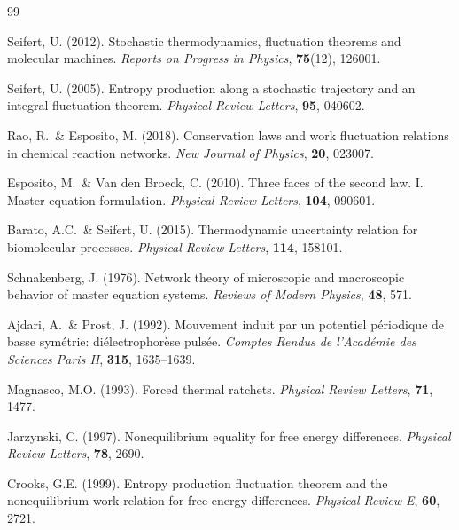 \documentclass[11pt,a4paper]{article}
\begin{document}
\begin{thebibliography}{99}

  Seifert, U. (2012).
  Stochastic thermodynamics, fluctuation theorems and molecular machines.
  \textit{Reports on Progress in Physics}, \textbf{75}(12), 126001.

  Seifert, U. (2005).
  Entropy production along a stochastic trajectory and an integral
  fluctuation theorem.
  \textit{Physical Review Letters}, \textbf{95}, 040602.

  Rao, R.\ \& Esposito, M. (2018).
  Conservation laws and work fluctuation relations in chemical reaction networks.
  \textit{New Journal of Physics}, \textbf{20}, 023007.

  Esposito, M.\ \& Van den Broeck, C. (2010).
  Three faces of the second law. I. Master equation formulation.
  \textit{Physical Review Letters}, \textbf{104}, 090601.

  Barato, A.C.\ \& Seifert, U. (2015).
  Thermodynamic uncertainty relation for biomolecular processes.
  \textit{Physical Review Letters}, \textbf{114}, 158101.

  Schnakenberg, J. (1976).
  Network theory of microscopic and macroscopic behavior of master equation
  systems.
  \textit{Reviews of Modern Physics}, \textbf{48}, 571.

  Ajdari, A.\ \& Prost, J. (1992).
  Mouvement induit par un potentiel p\'{e}riodique de basse sym\'{e}trie:
  di\'{e}lectrophor\`{e}se puls\'{e}e.
  \textit{Comptes Rendus de l'Acad\'{e}mie des Sciences Paris II},
  \textbf{315}, 1635--1639.

  Magnasco, M.O. (1993).
  Forced thermal ratchets.
  \textit{Physical Review Letters}, \textbf{71}, 1477.

  Jarzynski, C. (1997).
  Nonequilibrium equality for free energy differences.
  \textit{Physical Review Letters}, \textbf{78}, 2690.

  Crooks, G.E. (1999).
  Entropy production fluctuation theorem and the nonequilibrium work
  relation for free energy differences.
  \textit{Physical Review E}, \textbf{60}, 2721.


\end{thebibliography}
\end{document}
